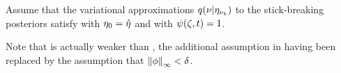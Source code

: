 \begin{assu}
%
Assume that the variational approximations $q(\nu \vert \eta_{\nu_{k}})$ to the
stick-breaking posteriors satisfy  with $\eta_0 =
\hat\eta$ and with $\psi(\zeta, t) = 1$.
%
\end{assu}

Note that  is actually weaker than
, the additional assumption in
 having been replaced by the assumption that
$\left\Vert\phi\right\Vert_{\infty} < \delta$.

